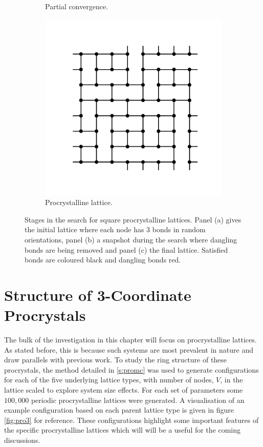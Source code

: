 \begin{figure}[bt]
\begin{subfigure}[b]{0.3\textwidth}
         \caption{Partial convergence.}
         \label{fig:promcb}
     \end{subfigure}
     \hfill
     \begin{subfigure}[b]{0.3\textwidth}
         \centering
         \includegraphics[width=\textwidth]{./figures/procrystals/pro_mc_4.pdf}
         \caption{Procrystalline lattice.}
         \label{fig:promcc}
     \end{subfigure}
     \hfill
     
     \caption{Stages in the \mc{} search for square procrystalline lattices. Panel (a) gives the initial lattice where each node has 3 bonds in random orientations, panel (b) a snapshot during the search where dangling bonds are being removed and panel (c) the final lattice. Satisfied bonds are coloured black and dangling bonds red.}
     \label{fig:promc}
\end{figure}

\section{Structure of 3\--Coordinate Procrystals}
\label{s:pro3}

The bulk of the investigation in this chapter will focus on procrystalline lattices. 
As stated before, this is because such systems are most prevalent in nature and draw parallels with previous work. 
To study the ring structure of these procrystals, the \mc{} method detailed in \ref{s:promc} was used to generate configurations for each of the five underlying lattice types, with number of nodes, $V$, in the lattice scaled to explore system size effects.
For each set of parameters some $100,000$ periodic procrystalline lattices were generated.
A visualisation of an example configuration based on each parent lattice type is given in figure \ref{fig:pro3} for reference. 
These configurations highlight some important features of the specific procrystalline lattices which will will be a useful for the coming discussions.

